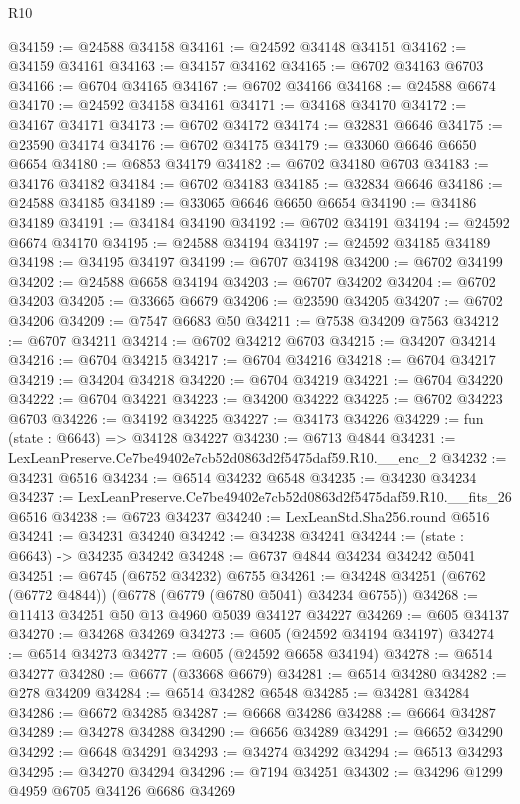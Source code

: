 \begin{lexlean}{R10}
\begin{coremodule}
@34159 := @24588 @34158
@34161 := @24592 @34148 @34151
@34162 := @34159 @34161
@34163 := @34157 @34162
@34165 := @6702 @34163 @6703
@34166 := @6704 @34165
@34167 := @6702 @34166
@34168 := @24588 @6674
@34170 := @24592 @34158 @34161
@34171 := @34168 @34170
@34172 := @34167 @34171
@34173 := @6702 @34172
@34174 := @32831 @6646
@34175 := @23590 @34174
@34176 := @6702 @34175
@34179 := @33060 @6646 @6650 @6654
@34180 := @6853 @34179
@34182 := @6702 @34180 @6703
@34183 := @34176 @34182
@34184 := @6702 @34183
@34185 := @32834 @6646
@34186 := @24588 @34185
@34189 := @33065 @6646 @6650 @6654
@34190 := @34186 @34189
@34191 := @34184 @34190
@34192 := @6702 @34191
@34194 := @24592 @6674 @34170
@34195 := @24588 @34194
@34197 := @24592 @34185 @34189
@34198 := @34195 @34197
@34199 := @6707 @34198
@34200 := @6702 @34199
@34202 := @24588 @6658 @34194
@34203 := @6707 @34202
@34204 := @6702 @34203
@34205 := @33665 @6679
@34206 := @23590 @34205
@34207 := @6702 @34206
@34209 := @7547 @6683 @50
@34211 := @7538 @34209 @7563
@34212 := @6707 @34211
@34214 := @6702 @34212 @6703
@34215 := @34207 @34214
@34216 := @6704 @34215
@34217 := @6704 @34216
@34218 := @6704 @34217
@34219 := @34204 @34218
@34220 := @6704 @34219
@34221 := @6704 @34220
@34222 := @6704 @34221
@34223 := @34200 @34222
@34225 := @6702 @34223 @6703
@34226 := @34192 @34225
@34227 := @34173 @34226
@34229 := fun (state : @6643) => @34128 @34227
@34230 := @6713 @4844
@34231 := LexLeanPreserve.Ce7be49402e7cb52d0863d2f5475daf59.R10.__enc_2
@34232 := @34231 @6516
@34234 := @6514 @34232 @6548
@34235 := @34230 @34234
@34237 := LexLeanPreserve.Ce7be49402e7cb52d0863d2f5475daf59.R10.__fits_26 @6516
@34238 := @6723 @34237
@34240 := LexLeanStd.Sha256.round @6516
@34241 := @34231 @34240
@34242 := @34238 @34241
@34244 := (state : @6643) -> @34235 @34242
@34248 := @6737 @4844 @34234 @34242 @5041
@34251 := @6745 (@6752 @34232) @6755
@34261 := @34248 @34251 (@6762 (@6772 @4844)) (@6778 (@6779 (@6780 @5041) @34234 @6755))
@34268 := @11413 @34251 @50 @13 @4960 @5039 @34127 @34227
@34269 := @605 @34137
@34270 := @34268 @34269
@34273 := @605 (@24592 @34194 @34197)
@34274 := @6514 @34273
@34277 := @605 (@24592 @6658 @34194)
@34278 := @6514 @34277
@34280 := @6677 (@33668 @6679)
@34281 := @6514 @34280
@34282 := @278 @34209
@34284 := @6514 @34282 @6548
@34285 := @34281 @34284
@34286 := @6672 @34285
@34287 := @6668 @34286
@34288 := @6664 @34287
@34289 := @34278 @34288
@34290 := @6656 @34289
@34291 := @6652 @34290
@34292 := @6648 @34291
@34293 := @34274 @34292
@34294 := @6513 @34293
@34295 := @34270 @34294
@34296 := @7194 @34251
@34302 := @34296 @1299 @4959 @6705 @34126 @6686 @34269

\end{coremodule}
\end{lexlean}
